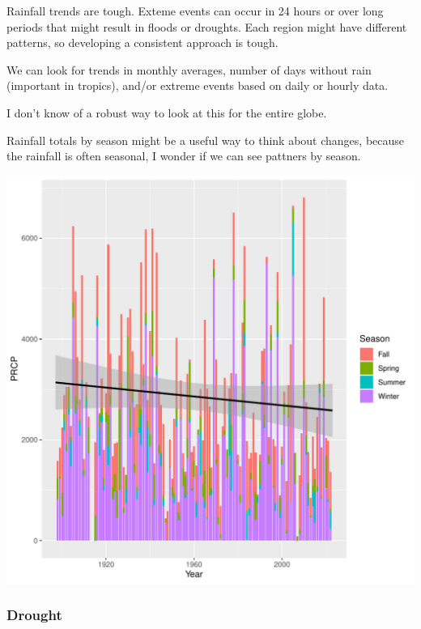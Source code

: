 \documentclass{article}
\begin{document}
\begin{itemize}
Rainfall trends are tough. Exteme events can occur in 24 hours or over long periods that might result in floods or droughts. Each region might have different patterns, so developing a consistent approach is tough.

We can look for trends in monthly averages, number of days without rain (important in tropics), and/or extreme events based on daily or hourly data. 

I don't know of a robust way to look at this for the entire globe. 



Rainfall totals by season might be a useful way to think about changes, because the rainfall is often seasonal, I wonder if we can see pattners by season. 

\begin{knitrout}
\color{fgcolor}\begin{kframe}


{\ttfamily\noindent\itshape{}}\end{kframe}
\includegraphics[width=\maxwidth]{figure/unnamed-chunk-8-1} 
\end{knitrout}

\subsubsection{Drought}


\end{itemize}
\end{document}
